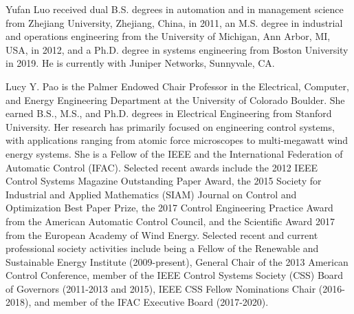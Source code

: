 \documentclass[journal]{IEEEtran}
\begin{document}
\begin{IEEEbiography}
  {Yufan Luo}
received dual B.S. degrees in automation and in management science from Zhejiang University, Zhejiang, China, in 2011, an M.S. degree in industrial and operations engineering from the University of Michigan, Ann Arbor, MI, USA, in 2012, and a Ph.D. degree in systems engineering from Boston University in 2019. He is currently with Juniper Networks, Sunnyvale, CA.

\end{IEEEbiography}

\begin{IEEEbiography}
  {Lucy Y. Pao} 
  is the Palmer Endowed Chair Professor in the Electrical, Computer, and Energy Engineering Department at the University of Colorado Boulder. She earned B.S., M.S., and Ph.D. degrees in Electrical Engineering from Stanford University. Her research has primarily focused on engineering control systems, with applications ranging from atomic force microscopes to multi-megawatt wind energy systems. She is a Fellow of the IEEE and the International Federation of Automatic Control (IFAC). Selected recent awards include the 2012 IEEE Control Systems Magazine Outstanding Paper Award, the 2015 Society for Industrial and Applied Mathematics (SIAM) Journal on Control and Optimization Best Paper Prize, the 2017 Control Engineering Practice Award from the American Automatic Control Council, and the Scientific Award 2017 from the European Academy of Wind Energy. Selected recent and current professional society activities include being a Fellow of the Renewable and Sustainable Energy Institute (2009-present), 
  General Chair of the 2013 American Control Conference, member of the IEEE Control Systems Society (CSS) Board of Governors (2011-2013 and 2015), IEEE CSS Fellow Nominations Chair (2016-2018), and member of the IFAC Executive Board (2017-2020).    

\end{IEEEbiography}
\end{document}

